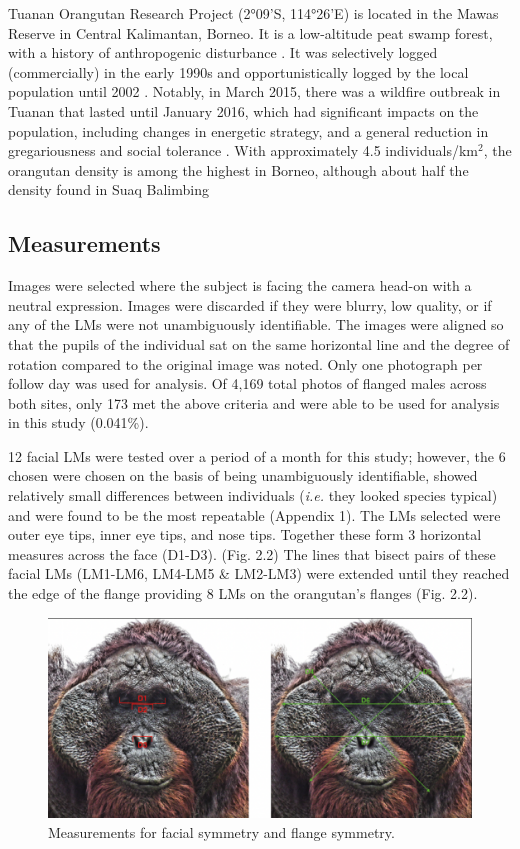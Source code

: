 Tuanan Orangutan Research Project (2°09'S, 114°26'E) is located in the Mawas Reserve in Central Kalimantan, Borneo. It is a low-altitude peat swamp forest, with a history of anthropogenic disturbance \citep{Schaik.2005}. It was selectively logged (commercially) in the early 1990s and opportunistically logged by the local population until 2002 \citep{Erb.2018}. Notably, in March 2015, there was a wildfire outbreak in Tuanan that lasted until January 2016, which had significant impacts on the population, including changes in energetic strategy, and a general reduction in gregariousness and social tolerance \citep{Erb.2018, Ashbury.2022}. With approximately 4.5 individuals/km$^{2}$, the orangutan density is among the highest in Borneo, although about half the density found in Suaq Balimbing \citep{Schaik.2005, Husson.2008} 

\subsection{Measurements}
Images were selected where the subject is facing the camera head-on with a neutral expression. Images were discarded if they were blurry, low quality, or if any of the LMs were not unambiguously identifiable. The images were aligned so that the pupils of the individual sat on the same horizontal line and the degree of rotation compared to the original image was noted. Only one photograph per follow day was used for analysis. Of 4,169 total photos of flanged males across both sites, only 173 met the above criteria and were able to be used for analysis in this study (0.041\%).

12 facial LMs were tested over a period of a month for this study; however, the 6 chosen were chosen on the basis of being unambiguously identifiable, showed relatively small differences between individuals (\textit{i.e.} they looked species typical) and were found to be the most repeatable (Appendix 1). The LMs selected were outer eye tips, inner eye tips, and nose tips. Together these form 3 horizontal measures across the face (D1-D3). (Fig. 2.2) The lines that bisect pairs of these facial LMs (LM1-LM6, LM4-LM5 \& LM2-LM3) were extended until they reached the edge of the flange providing 8 LMs on the orangutan's flanges (Fig. 2.2). 


\begin{figure}
    \centering
    \includegraphics[width=1.0\textwidth]{Chapter2/Figs/Vector/mawasboth.eps}
    \caption{Measurements for facial symmetry and flange symmetry. }
    \label{fig:orangutanfameasures}
\end{figure}


